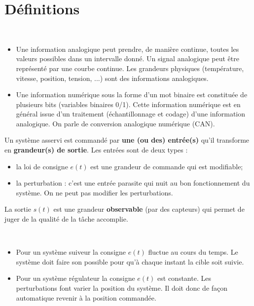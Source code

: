 \documentclass[10pt,fleqn]{article} %
\begin{document}

\vspace{2cm}
\pagestyle{fancy}
\thispagestyle{plain}

\section{Définitions}



\begin{defi} ~\\
\begin{itemize}[label=,font=\color{ocre}] 
\item Une information analogique peut prendre, de manière continue, toutes les valeurs
possibles dans un intervalle donné. Un signal analogique peut être représenté
par une courbe continue. Les grandeurs physiques (température, vitesse,
position, tension, ...) sont des informations analogiques.

\item Une information numérique sous la forme d'un mot binaire est constituée de
plusieurs bits (variables binaires 0/1). Cette information numérique est en
général issue d'un traitement (échantillonnage et codage) d'une information
analogique. On parle de conversion analogique numérique (CAN).
\end{itemize}
\end{defi}

\begin{defi}

Un système asservi est commandé par \textbf{une (ou des) entrée(s)} qu'il
transforme en \textbf{grandeur(s) de sortie}.
Les entrées sont de deux types : 
\begin{itemize}
 \item la loi de consigne $e(t)$ est une grandeur de commande qui est
modifiable;
\item la perturbation : c'est une entrée parasite qui nuit au bon
fonctionnement du système. On ne peut pas modifier les perturbations.
\end{itemize}

La sortie $s(t)$ est une grandeur \textbf{observable} (par des capteurs) qui
permet de juger de la qualité de la tâche accomplie.
\end{defi} 


\begin{defi} ~\\
\begin{itemize}[label=,font=\color{ocre}] 
\item Pour un système suiveur la consigne $e(t)$ fluctue au cours du temps. Le système doit faire son possible pour qu'à chaque instant la cible soit suivie.
\item Pour un système régulateur la consigne $e(t)$ est constante. Les perturbations font varier la position du système. Il doit donc de façon automatique revenir à la position commandée.
\end{itemize}
\end{defi}
\end{document}

